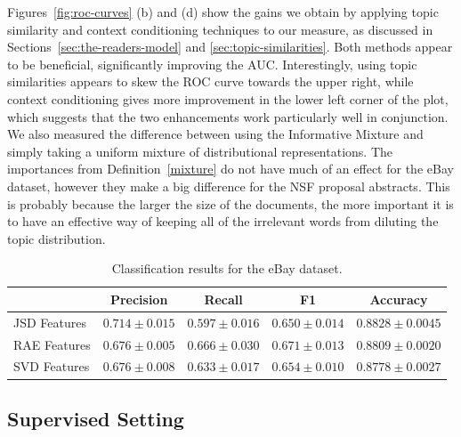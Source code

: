 Figures~\ref{fig:roc-curves} (b) and (d)  
show the gains we obtain by applying topic
similarity and context conditioning techniques to our measure, as
discussed in Sections~\ref{sec:the-readers-model} and
\ref{sec:topic-similarities}. Both methods appear to be beneficial,
significantly improving the AUC. Interestingly, using
topic similarities appears to skew the ROC curve towards the upper
right, while context conditioning gives more improvement in the lower
left corner of the plot, which suggests that the two enhancements work
particularly well in conjunction. 
We also measured the difference between using 
the Informative Mixture and simply taking a uniform mixture of
distributional representations. The importances from
Definition~\ref{mixture} do not have much of an effect for the eBay
dataset, however they make a big difference
for the NSF proposal abstracts. This is probably because
the larger the size of the documents, the more important it is to
have an effective way of keeping all of the irrelevant words from
diluting the topic distribution. 

\begin{table}[t]
\renewcommand{\arraystretch}{1.3}
\caption{Classification results for the eBay dataset.}
\label{tab:classification-results}
\centering
\begin{tabular}{l||c|c|c|c}
&Precision & Recall & F1 & Accuracy
\\ \hline \hline
JSD Features         &$\mathbf{0.714}\pm 0.015$&$0.597\pm 0.016$&$0.650\pm
0.014$& $\mathbf{0.8828}\pm 0.0045$\\
RAE Features         &$0.676\pm 0.005$&$\mathbf{0.666}\pm 0.030$&$\mathbf{0.671}\pm
0.013$&$0.8809\pm 0.0020$ \\
SVD Features             &$0.676\pm 0.008$&$0.633\pm 0.017$&$0.654\pm
0.010$&$0.8778\pm 0.0027$\\
\end{tabular}
\end{table}

\subsection{Supervised Setting}
\label{sec:text-embeddings}


